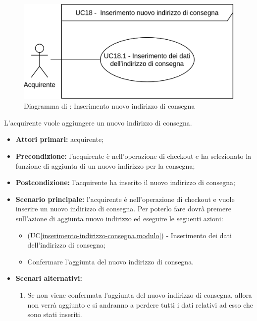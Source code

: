 
\label{inserimento-indirizzo-consegna}

\begin{figure}[H]
    \centering
    \includegraphics[scale=1]{Immagini/DiagrammiUC/InserimentoIndirizzoConsegna.png}
    \caption{Diagramma di \actualUC: Inserimento nuovo indirizzo di consegna} 
    \label{fig:InserimentoIndirizzoConsegna}
\end{figure}

L'acquirente vuole aggiungere un nuovo indirizzo di consegna.
\begin{itemize}
    \item \textbf{Attori primari:} acquirente;
    \item \textbf{Precondizione:} l'acquirente è nell'operazione di checkout e ha selezionato la funzione di aggiunta di un nuovo indirizzo per la consegna;
    \item \textbf{Postcondizione:} l'acquirente ha inserito il nuovo indirizzo di consegna;
    \item \textbf{Scenario principale:} l'acquirente è nell'operazione di checkout e vuole inserire un nuovo indirizzo di consegna. Per poterlo fare dovrà premere sull'azione di aggiunta nuovo indirizzo ed eseguire le seguenti azioni:
    \begin{itemize}
        \item (UC\ref{inserimento-indirizzo-consegna.modulo}) - Inserimento dei dati dell'indirizzo di consegna; 
        \item Confermare l'aggiunta del nuovo indirizzo di consegna.
    \end{itemize}
    \item \textbf{Scenari alternativi:}
    \begin{enumerate}[label=\lett]
        \item Se non viene confermata l'aggiunta del nuovo indirizzo di consegna, allora non verrà aggiunto e si andranno a perdere tutti i dati relativi ad esso che sono stati inseriti.
    \end{enumerate}
\end{itemize}

